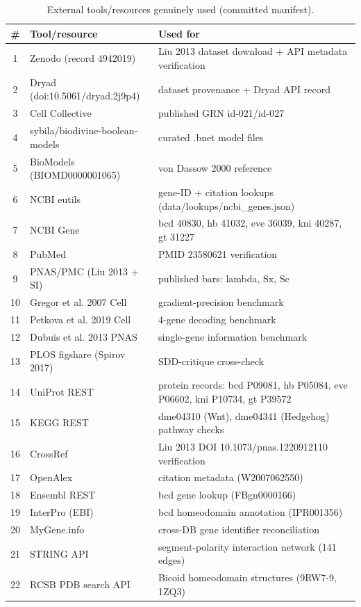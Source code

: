 \begin{table}[!htbp]
\centering
\caption{External tools/resources genuinely used (committed manifest).}
\label{tab:tools}
\small
\begin{tabular}{clp{8.5cm}}
\toprule
\# & Tool/resource & Used for \\
\midrule
1 & Zenodo (record 4942019) & Liu 2013 dataset download + API metadata verification \\
2 & Dryad (doi:10.5061/dryad.2j9p4) & dataset provenance + Dryad API record \\
3 & Cell Collective & published GRN id-021/id-027 \\
4 & sybila/biodivine-boolean-models & curated .bnet model files \\
5 & BioModels (BIOMD0000001065) & von Dassow 2000 reference \\
6 & NCBI eutils & gene-ID + citation lookups (data/lookups/ncbi\_genes.json) \\
7 & NCBI Gene & bcd 40830, hb 41032, eve 36039, kni 40287, gt 31227 \\
8 & PubMed & PMID 23580621 verification \\
9 & PNAS/PMC (Liu 2013 + SI) & published bars: lambda, Sx, Sc \\
10 & Gregor et al. 2007 Cell & gradient-precision benchmark \\
11 & Petkova et al. 2019 Cell & 4-gene decoding benchmark \\
12 & Dubuis et al. 2013 PNAS & single-gene information benchmark \\
13 & PLOS figshare (Spirov 2017) & SDD-critique cross-check \\
14 & UniProt REST & protein records: bcd P09081, hb P05084, eve P06602, kni P10734, gt P39572 \\
15 & KEGG REST & dme04310 (Wnt), dme04341 (Hedgehog) pathway checks \\
16 & CrossRef & Liu 2013 DOI 10.1073/pnas.1220912110 verification \\
17 & OpenAlex & citation metadata (W2007062550) \\
18 & Ensembl REST & bcd gene lookup (FBgn0000166) \\
19 & InterPro (EBI) & bcd homeodomain annotation (IPR001356) \\
20 & MyGene.info & cross-DB gene identifier reconciliation \\
21 & STRING API & segment-polarity interaction network (141 edges) \\
22 & RCSB PDB search API & Bicoid homeodomain structures (9RW7-9, 1ZQ3) \\

\end{tabular}
\end{table}
